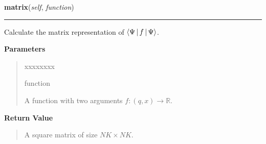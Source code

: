 \hspace{.8\funcindent}\begin{boxedminipage}{\funcwidth}

    \raggedright \textbf{matrix}(\textit{self}, \textit{function})

    \vspace{-1.5ex}

    \rule{\textwidth}{0.5\fboxrule}
\setlength{\parskip}{2ex}
    Calculate the matrix representation of
    $\Braket{\Psi|f|\Psi}$.

\setlength{\parskip}{1ex}
      \textbf{Parameters}
      \vspace{-1ex}

      \begin{quote}
        \begin{Ventry}{xxxxxxxx}

          \item[function]

          A function with two arguments $f:(q, x) \rightarrow \mathbb{R}$.

        \end{Ventry}

      \end{quote}

      \textbf{Return Value}
    \vspace{-1ex}

      \begin{quote}
      A square matrix of size $NK \times NK$.

      \end{quote}

    \end{boxedminipage}

    \label{HagedornMultiWavepacket:HagedornMultiWavepacket:get_norm}

    \vspace{0.5ex}

